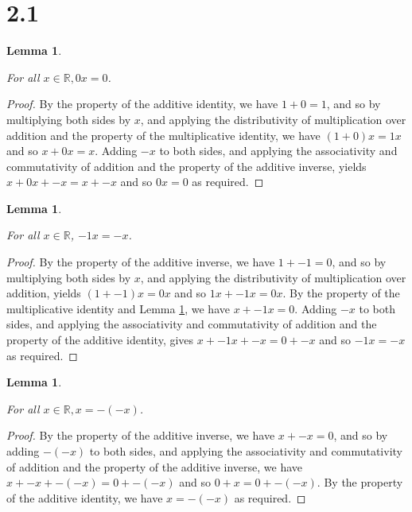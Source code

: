 \documentclass{article}
\theoremstyle{plain}
\newtheorem{lem}[thm]{Lemma}
\begin{document}
\section*{2.1}

\begin{lem}
    \label{lem_0_mult}

    For all $x \in \mathbb{R}, 0x = 0$.
\end{lem}

\begin{proof}
    By the property of the additive identity, we have $1 + 0 = 1$, and so by multiplying both sides by $x$, and applying the distributivity of multiplication over addition and the property of the multiplicative identity, we have $(1 + 0)x = 1x$ and so $x + 0x = x$. Adding $-x$ to both sides, and applying the associativity and commutativity of addition and the property of the additive inverse, yields $x + 0x + -x = x + -x$ and so $0x = 0$ as required.
\end{proof}

\begin{lem}
    \label{lem_minus_1_neg}

    For all $x \in \mathbb{R}$, $-1x = -x$.
\end{lem}

\begin{proof}
    By the property of the additive inverse, we have $1 + -1 = 0$, and so by multiplying both sides by $x$, and applying the distributivity of multiplication over addition, yields $(1 + -1)x = 0x$ and so $1x + -1x = 0x$. By the property of the multiplicative identity and Lemma \ref{lem_0_mult}, we have $x + -1x = 0$. Adding $-x$ to both sides, and applying the associativity and commutativity of addition and the property of the additive identity, gives $x + -1x + -x = 0 + -x$ and so $-1x = -x$ as required.
\end{proof}

\begin{lem}
    \label{lem_double_neg}

    For all $x \in \mathbb{R}, x = -(-x)$.
\end{lem}

\begin{proof}
    By the property of the additive inverse, we have $x + -x = 0$, and so by adding $-(-x)$ to both sides, and applying the associativity and commutativity of addition and the property of the additive inverse, we have $x + -x + -(-x) = 0 + -(-x)$ and so $0 + x = 0 + -(-x)$. By the property of the additive identity, we have $x = -(-x)$ as required.
\end{proof}
\end{document}

